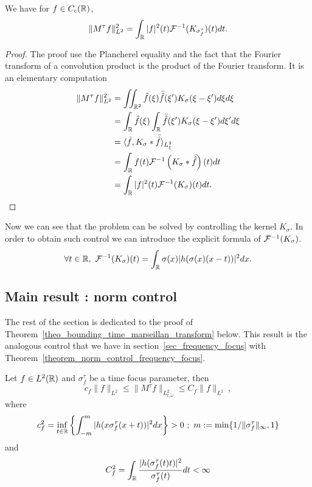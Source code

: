 \begin{corollary}
	We have for $f\in C_c(\mathbb{R})$,
	\begin{equation}
		\|M^\tau f\|_{L^2}^2 = \int_{\mathbb{R}} |f|^2(t)\mathcal{F}^{-1}(K_{\sigma_f^\tau})(t) dt.
	\end{equation}
\end{corollary}
\begin{proof}
	The proof use the Plancherel equality and the fact that the Fourier transform of a convolution product is the product of the Fourier transform. It is an elementary computation
	\begin{align*}
		\|M^\tau f\|_{L^2}^2  &= \iint_{\mathbb{R}^2} \hat{f}(\xi)\bar{\hat{f}}(\xi') K_{\sigma}(\xi-\xi') d\xi d\xi \\
		& = \int_{\mathbb{R}} \hat{f}(\xi) \int_{\mathbb{R}} \bar{\hat{f}}(\xi')K_\sigma(\xi-\xi')d\xi' d\xi \\
		& = \langle \hat{f} , K_\sigma \ast \bar{\hat{f}} \rangle_{L^2_\xi} \\
		& = \int_{\mathbb{R}} f(t) \mathcal{F}^{-1}\left( K_\sigma \ast \bar{\hat{f}} \right)(t) dt \\
		& = \int_{\mathbb{R}} |f|^2(t)\mathcal{F}^{-1}(K_\sigma)(t)dt. 
	\end{align*}
\end{proof}

Now we can see that the problem can be solved by controlling the kernel $K_\sigma$. In order to obtain such control we can introduce the explicit formula of $\mathcal{F}^{-1}(K_\sigma)$.
\begin{equation}\label{eq_formula_inverse_fourier_kernel}
		\forall t\in\mathbb{R}, \ \mathcal{F}^{-1}(K_\sigma)(t) = \int_{\mathbb{R}} \sigma(x)|h(\sigma(x)(x-t))|^2dx.
\end{equation}


\subsection{Main result : norm control}

The rest of the section is dedicated to the proof of Theorem~\ref{theo_bounding_time_marseillan_transform} below. This result is the analogous control that we have in section~\ref{sec_frequency_focus} with  Theorem~\ref{theorem_norm_control_frequency_focus}.


\begin{theorem}\label{theo_bounding_time_marseillan_transform}
	Let $f\in L^2(\mathbb{R})$ and $\sigma_f^\tau$ be a time focus parameter, then
	\begin{equation}
		c_f \|f\|_{L^2} \leqslant\| M^\tau f\|_{L^2_{t,\omega}} \leqslant C_f \|f\|_{L^2}\ ,
	\end{equation} 
	where
	\begin{equation}
		c_f^2 = \inf_{t\in\R}\left\{ \int_{-m}^{m}|h(x\sigma_f^\tau(x+t))|^2 dx \right\}>0 \ ; \ m:=\min\{1/\|\sigma_f^\tau\|_\infty,1\}
	\end{equation}
	and
	\begin{equation*}
		C_f^2 = \int_{\mathbb{R}} \frac{|h(\sigma_f^\tau(t)t)|^2}{\sigma_f^\tau(t)}dt < \infty
	\end{equation*}
\end{theorem}

